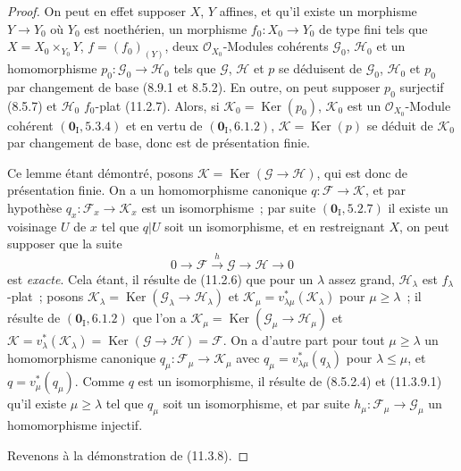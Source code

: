 \begin{proof}
On peut en effet supposer $X$, $Y$ affines, et qu'il existe un morphisme
$Y\to Y_0$ où $Y_0$ est noethérien, un morphisme $f_0:X_0\to Y_0$ de type fini
tels que $X=X_0\times_{Y_0}Y$, $f=(f_0)_{(Y)}$, deux
$\mathcal O_{X_0}$-Modules cohérents $\mathcal G_0$, $\mathcal H_0$ et un
homomorphisme $p_0:\mathcal G_0\to\mathcal H_0$ tels que $\mathcal G$,
$\mathcal H$ et $p$ se déduisent de $\mathcal G_0$, $\mathcal H_0$ et $p_0$ par
changement de base (8.9.1 et 8.5.2). En outre, on peut supposer $p_0$ surjectif
(8.5.7) et $\mathcal H_0$ $f_0$-plat (11.2.7). Alors, si
$\mathcal K_0=\operatorname{Ker}(p_0)$, $\mathcal K_0$ est un
$\mathcal O_{X_0}$-Module cohérent $(\mathbf 0_{\mathrm I},5.3.4)$ et en vertu
de $(\mathbf 0_{\mathrm I},6.1.2)$, $\mathcal K=\operatorname{Ker}(p)$ se déduit de
$\mathcal K_0$ par changement de base, donc est de présentation finie.

Ce lemme étant démontré, posons $\mathcal K=\operatorname{Ker}(\mathcal G\to\mathcal H)$,
qui est donc de présentation finie. On a un homomorphisme canonique
$q:\mathcal F\to\mathcal K$, et par hypothèse
$q_x:\mathcal F_x\to\mathcal K_x$ est un isomorphisme~; par suite
$(\mathbf 0_{\mathrm I},5.2.7)$ il existe un voisinage $U$ de $x$ tel que
$q|U$ soit un isomorphisme, et en restreignant $X$, on peut supposer que la
suite
\[
0\longrightarrow\mathcal F\xrightarrow{h}\mathcal G
\longrightarrow\mathcal H\longrightarrow0
\]
est \emph{exacte}. Cela étant, il résulte de (11.2.6) que pour un $\lambda$
assez grand, $\mathcal H_\lambda$ est $f_\lambda$-plat~;
posons $\mathcal K_\lambda=\operatorname{Ker}(\mathcal G_\lambda\to\mathcal H_\lambda)$ et
$\mathcal K_\mu=v_{\lambda\mu}^*(\mathcal K_\lambda)$ pour $\mu\geq\lambda$~;
il résulte de $(\mathbf 0_{\mathrm I},6.1.2)$ que l'on a
$\mathcal K_\mu=\operatorname{Ker}(\mathcal G_\mu\to\mathcal H_\mu)$ et
$\mathcal K=v_\lambda^*(\mathcal K_\lambda)
=\operatorname{Ker}(\mathcal G\to\mathcal H)=\mathcal F$. On a d'autre part pour tout
$\mu\geq\lambda$ un homomorphisme canonique
$q_\mu:\mathcal F_\mu\to\mathcal K_\mu$ avec
$q_\mu=v_{\lambda\mu}^*(q_\lambda)$ pour $\lambda\leq\mu$, et
$q=v_\mu^*(q_\mu)$. Comme $q$ est un isomorphisme, il résulte de (8.5.2.4) et
(11.3.9.1) qu'il existe $\mu\geq\lambda$ tel que $q_\mu$ soit un isomorphisme,
et par suite $h_\mu:\mathcal F_\mu\to\mathcal G_\mu$ un homomorphisme
injectif.

Revenons à la démonstration de (11.3.8).


\end{proof}
